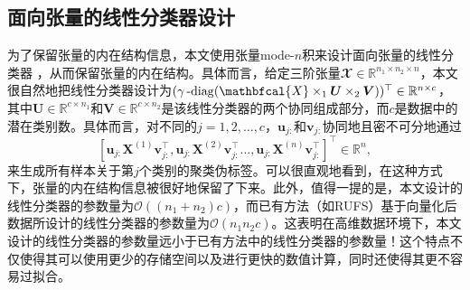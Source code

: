 \subsection{面向张量的线性分类器设计}\label{sec:design-classf}
为了保留张量的内在结构信息，本文使用张量mode-$n$积来设计面向张量的线性分类器
，从而保留张量的内在结构。具体而言，给定三阶张量$\mathbfcal{X}\in\mathbb{R}^{n_{1}\times n_{2}\times n}$，本文很自然地把线性分类器设计为$(\mydiag(\mathbfcal{X}\times_{1}\boldsymbol{U}\times_{2}\boldsymbol{V}))^{\top}\in\mathbb{R}^{n\times c}$，其中$\boldsymbol{U}\in\mathbb{R}^{c\times n_{1}}$和$\boldsymbol{V}\in\mathbb{R}^{c\times n_{2}}$是该线性分类器的两个协同组成部分，而$c$是数据中的潜在类别数。具体而言，对不同的$j=1,2,\ldots,c$，$\boldsymbol{u}_{j:}$和$\boldsymbol{v}_{j:}$协同地且密不可分地通过
\begin{equation*}
    \left[\boldsymbol{u}_{j:}\boldsymbol{X}^{(1)}\boldsymbol{v}_{j:}^{\top},\boldsymbol{u}_{j:}\boldsymbol{X}^{(2)}\boldsymbol{v}_{j:}^{\top}\ldots,\boldsymbol{u}_{j:}\boldsymbol{X}^{(n)}\boldsymbol{v}_{j:}^{\top}\right]^{\top}\in\mathbb{R}^{n},
\end{equation*}
来生成所有样本关于第$j$个类别的聚类伪标签。可以很直观地看到，在这种方式下，张量的内在结构信息被很好地保留了下来。此外，值得一提的是，本文设计的线性分类器的参数量为$\mathcal{O}((n_1+n_2)c)$，而已有方法（如RUFS）基于向量化后数据所设计的线性分类器的参数量为$\mathcal{O}(n_1 n_2 c)$。这表明在高维数据环境下，本文设计的线性分类器的参数量远小于已有方法中的线性分类器的参数量！这个特点不仅使得其可以使用更少的存储空间以及进行更快的数值计算，同时还使得其更不容易过拟合。

